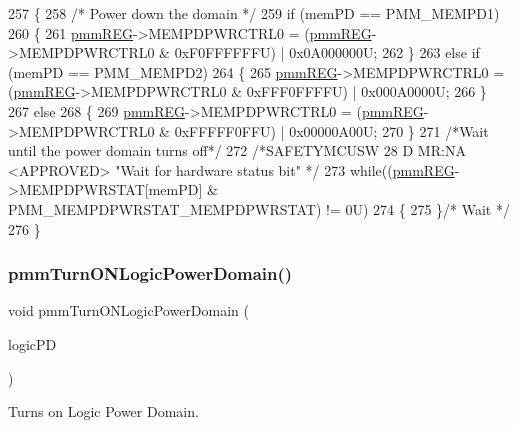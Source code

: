 \begin{DoxyCode}
257 \{
258     \textcolor{comment}{/* Power down the domain */}
259     \textcolor{keywordflow}{if} (memPD == PMM\_MEMPD1)
260     \{
261         \mbox{\hyperlink{reg__pmm_8h_a57b193bea1bf1951b97bdfee07f48598}{pmmREG}}->MEMPDPWRCTRL0 = (\mbox{\hyperlink{reg__pmm_8h_a57b193bea1bf1951b97bdfee07f48598}{pmmREG}}->MEMPDPWRCTRL0 & 0xF0FFFFFFU) | 0x0A000000U;
262     \}
263     \textcolor{keywordflow}{else} \textcolor{keywordflow}{if} (memPD == PMM\_MEMPD2)
264     \{
265         \mbox{\hyperlink{reg__pmm_8h_a57b193bea1bf1951b97bdfee07f48598}{pmmREG}}->MEMPDPWRCTRL0 = (\mbox{\hyperlink{reg__pmm_8h_a57b193bea1bf1951b97bdfee07f48598}{pmmREG}}->MEMPDPWRCTRL0 & 0xFFF0FFFFU) | 0x000A0000U;
266     \}
267     \textcolor{keywordflow}{else}
268     \{
269         \mbox{\hyperlink{reg__pmm_8h_a57b193bea1bf1951b97bdfee07f48598}{pmmREG}}->MEMPDPWRCTRL0 = (\mbox{\hyperlink{reg__pmm_8h_a57b193bea1bf1951b97bdfee07f48598}{pmmREG}}->MEMPDPWRCTRL0 & 0xFFFFF0FFU) | 0x00000A00U;
270     \}
271     \textcolor{comment}{/*Wait until the power domain turns off*/}
272     \textcolor{comment}{/*SAFETYMCUSW 28 D MR:NA <APPROVED> "Wait for hardware status bit" */}
273     \textcolor{keywordflow}{while}((\mbox{\hyperlink{reg__pmm_8h_a57b193bea1bf1951b97bdfee07f48598}{pmmREG}}->MEMPDPWRSTAT[memPD] & PMM\_MEMPDPWRSTAT\_MEMPDPWRSTAT) != 0U)
274     \{ 
275     \}\textcolor{comment}{/* Wait */}  
276 \}
\end{DoxyCode}
\mbox{\label{group__PMM_ga4caba5b694f4399bd0dc05030895d421}} 
\subsubsection{\texorpdfstring{pmm\+Turn\+O\+N\+Logic\+Power\+Domain()}{pmmTurnONLogicPowerDomain()}}
{\footnotesize\ttfamily void pmm\+Turn\+O\+N\+Logic\+Power\+Domain (\begin{DoxyParamCaption}\item[{pmm\+\_\+\+Logic\+P\+D\+\_\+t}]{logic\+PD }\end{DoxyParamCaption})}



Turns on Logic Power Domain. 


